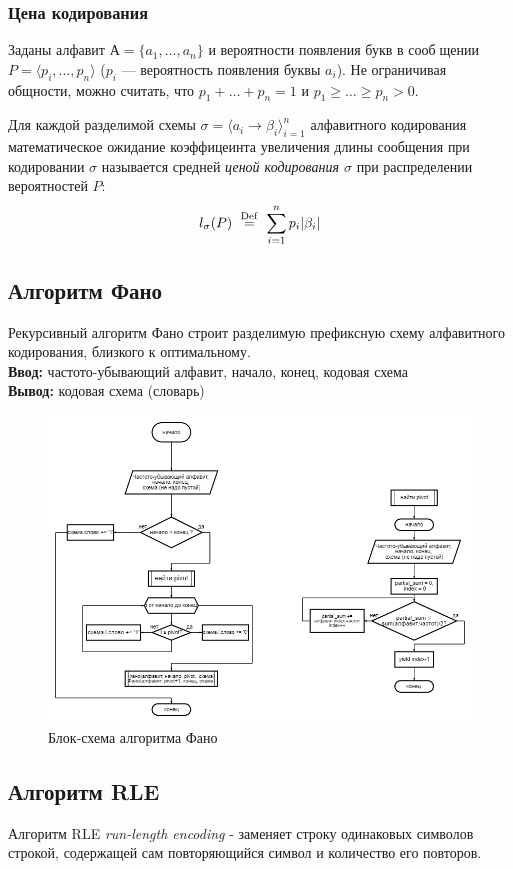 \documentclass[12pt]{article} %
\newcommand\myeq{\stackrel{\rm Def}{=}}
\begin{document}
\subsubsection{Цена кодирования}
Заданы алфавит $А = \{a_1,...,a_n \}$ и вероятности появления букв в сообщении $P = \langle p_i,\dots ,p_n\rangle$ ($p_i$ — вероятность появления буквы $a_i$). Не ограничивая общности, можно считать, что $ p_1 + \dots + p_n = 1$ и $p_1 \geq \dots \geq p_n > 0$.

Для каждой разделимой схемы $\sigma = \langle a_i \rightarrow \beta_i \rangle ^n _{i=1}$ алфавитного кодирования математическое ожидание коэффицеинта увеличения длины сообщения при кодировании $\sigma$ называется  средней \textit{ценой кодирования $\sigma$} при распределении вероятностей $P$:
\[ l_\sigma (P) \,\,\myeq\,\, \sum^n_{i=1}{p_i \lvert \beta_i\rvert}\]

\newpage
\subsection{Алгоритм Фано}
Рекурсивный алгоритм Фано строит разделимую префиксную схему алфавитного кодирования, близкого к оптимальному.\\ 
\textbf{Ввод: } частото-убывающий алфавит, начало, конец, кодовая схема\\
\textbf{Вывод: } кодовая схема (словарь)
\begin{figure}[H]
\includegraphics[scale =0.5]{fano.png}
\caption{Блок-схема алгоритма Фано}
\end{figure}
\newpage
\subsection{Алгоритм RLE}
Алгоритм RLE \textit{run-length encoding} - заменяет строку одинаковых символов строкой, содержащей сам повторяющийся символ и количество его повторов.
\end{document}
